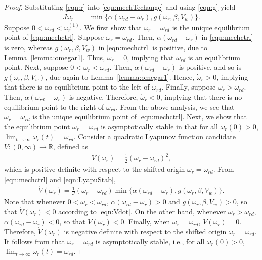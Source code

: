 \documentclass[journal]{IEEEtran}
\begin{document}
\begin{proof}
Substituting \eqref{eqn:r} into \eqref{eqn:mechTechange} and using \eqref{eqn:g} yield
\begin{align}
J\dot{\omega}_r&=\min\{\alpha (\omega_{rd}-\omega_r),g(\omega_r, \beta, V_w)\}.\label{eqn:mechctrl}
\end{align}
Suppose $0<\omega_{rd}<\omega_r^{(1)}$. We first show that $\omega_r=\omega_{rd}$ is the unique equilibrium point of \eqref{eqn:mechctrl}. Suppose $\omega_r=\omega_{rd}$. Then, $\alpha(\omega_{rd}-\omega_r)$ in \eqref{eqn:mechctrl} is zero, whereas $g(\omega_r, \beta, V_w)$ in \eqref{eqn:mechctrl} is positive, due to Lemma~\ref{lemma:omegar1}. Thus, $\dot{\omega}_r=0$, implying that $\omega_{rd}$ is an equilibrium point. Next, suppose $0<\omega_r<\omega_{rd}$. Then, $\alpha(\omega_{rd}-\omega_r)$ is positive, and so is $g(\omega_r, \beta, V_w)$, due again to Lemma~\ref{lemma:omegar1}. Hence, $\dot{\omega}_r>0$, implying that there is no equilibrium point to the left of $\omega_{rd}$. Finally, suppose $\omega_r>\omega_{rd}$. Then, $\alpha(\omega_{rd}-\omega_r)$ is negative. Therefore, $\dot{\omega}_r<0$, implying that there is no equilibrium point to the right of $\omega_{rd}$. From the above analysis, we see that $\omega_r=\omega_{rd}$ is the unique equilibrium point of \eqref{eqn:mechctrl}. Next, we show that the equilibrium point $\omega_r=\omega_{rd}$ is asymptotically stable in that for all $\omega_r(0)>0$, $\lim_{t\rightarrow\infty}\omega_r(t)=\omega_{rd}$. Consider a quadratic Lyapunov function candidate $V:(0, \infty)\rightarrow\mathbb{R}$, defined as
\begin{align}
V(\omega_r)=\frac{1}{2}(\omega_r-\omega_{rd})^2,\label{eqn:LyapuStab}
\end{align}
which is positive definite with respect to the shifted origin $\omega_r=\omega_{rd}$. From \eqref{eqn:mechctrl} and \eqref{eqn:LyapuStab},
\begin{align}
\dot{V}(\omega_r)=\frac{1}{J}(\omega_r-\omega_{rd})\min\{\alpha (\omega_{rd}-\omega_r),g(\omega_r, \beta, V_w)\}. \label{eqn:Vdot}
\end{align}
Note that whenever $0<\omega_r<\omega_{rd}$, $\alpha(\omega_{rd}-\omega_r)>0$ and $g(\omega_r, \beta, V_w)>0$, so that $\dot{V}(\omega_r)<0$ according to \eqref{eqn:Vdot}. On the other hand, whenever $\omega_r>\omega_{rd}$, $\alpha(\omega_{rd}-\omega_r)<0$, so that $\dot{V}(\omega_r)<0$. Finally, when $\omega_r=\omega_{rd}$, $\dot{V}(\omega_r)=0$. Therefore, $\dot{V}(\omega_r)$ is negative definite with respect to the shifted origin $\omega_r=\omega_{rd}$. It follows from \cite{Khalil01} that $\omega_r=\omega_{rd}$ is asymptotically stable, i.e., for all $\omega_r(0)>0$, $\lim_{t \rightarrow \infty}\omega_r(t)=\omega_{rd}$.
\end{proof}
\end{document}
